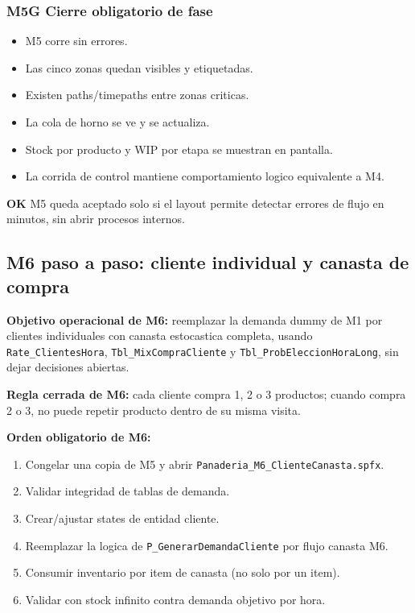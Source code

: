 \documentclass[11pt]{article}
\newcommand{\simio}[1]{\texttt{#1}}
\newcommand{\tabla}[1]{\texttt{#1}}
\newcommand{\proc}[1]{\texttt{#1}}
\newcommand{\ok}{\textcolor{verdeok}{\textbf{OK}}}
\begin{document}
\subsubsection{M5G Cierre obligatorio de fase}
\begin{itemize}
  \item M5 corre sin errores.
  \item Las cinco zonas quedan visibles y etiquetadas.
  \item Existen paths/timepaths entre zonas criticas.
  \item La cola de horno se ve y se actualiza.
  \item Stock por producto y WIP por etapa se muestran en pantalla.
  \item La corrida de control mantiene comportamiento logico equivalente a M4.
\end{itemize}

\ok{} M5 queda aceptado solo si el layout permite detectar errores de flujo en minutos, sin abrir procesos internos.

\subsection{M6 paso a paso: cliente individual y canasta de compra}
\textbf{Objetivo operacional de M6:} reemplazar la demanda dummy de M1 por clientes individuales con canasta estocastica completa, usando \tabla{Rate\_ClientesHora}, \tabla{Tbl\_MixCompraCliente} y \tabla{Tbl\_ProbEleccionHoraLong}, sin dejar decisiones abiertas.

\textbf{Regla cerrada de M6:} cada cliente compra 1, 2 o 3 productos; cuando compra 2 o 3, no puede repetir producto dentro de su misma visita.

\textbf{Orden obligatorio de M6:}
\begin{enumerate}
  \item Congelar una copia de M5 y abrir \simio{Panaderia\_M6\_ClienteCanasta.spfx}.
  \item Validar integridad de tablas de demanda.
  \item Crear/ajustar states de entidad cliente.
  \item Reemplazar la logica de \proc{P\_GenerarDemandaCliente} por flujo canasta M6.
  \item Consumir inventario por item de canasta (no solo por un item).
  \item Validar con stock infinito contra demanda objetivo por hora.
\end{enumerate}
\end{document}

